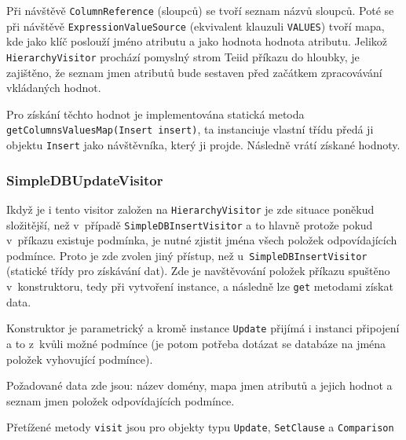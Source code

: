 \documentclass[oneside,12pt]{fithesis2}
\begin{document}
Při návštěvě \texttt{ColumnReference} (sloupců) se tvoří seznam názvů sloupců. Poté se při návštěvě \texttt{ExpressionValueSource} (ekvivalent klauzuli \texttt{VALUES}) tvoří mapa, kde jako klíč poslouží jméno atributu a jako hodnota hodnota atributu. Jelikož \texttt{HierarchyVisitor} prochází pomyslný strom Teiid příkazu do hloubky, je zajištěno, že seznam jmen atributů bude sestaven před začátkem zpracovávání vkládaných hodnot.

Pro získání těchto hodnot je implementována statická metoda \texttt{get\allowbreak Columns\allowbreak ValuesMap(Insert insert)}, ta instanciuje vlastní třídu předá ji objektu \texttt{Insert} jako návštěvníka, který ji projde. Následně vrátí získané hodnoty.

\subsubsection*{SimpleDBUpdateVisitor}
Ikdyž je i tento visitor založen na \texttt{HierarchyVisitor} je zde situace poněkud složitější, než v~případě \texttt{SimpleDBInsertVisitor} a to hlavně protože pokud v~příkazu existuje podmínka, je nutné zjistit jména všech položek odpovídajících podmínce. Proto je zde zvolen jiný přístup, než u~\texttt{SimpleDBInsertVisitor} (statické třídy pro získávání dat). Zde je navštěvování položek příkazu spuštěno v~konstruktoru, tedy při vytvoření instance, a následně lze \texttt{get} metodami získat  data.

Konstruktor je parametrický a kromě instance \texttt{Update} přijímá i instanci připojení a to z~kvůli možné podmínce (je potom potřeba dotázat se databáze na jména položek vyhovující podmínce).

Požadované data zde jsou: název domény, mapa jmen atributů a jejich hodnot a seznam jmen položek odpovídajících podmínce.

Přetížené metody \texttt{visit} jsou pro objekty typu \texttt{Update}, \texttt{SetClause} a \texttt{Comparison}
\end{document}

